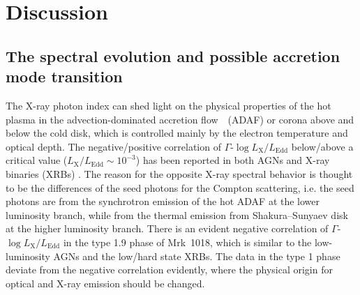 \section{Discussion}\label{sec:discussion}
\subsection{The spectral evolution and possible accretion mode transition }
\label{sec:spectral evolution}
The X-ray photon index can shed light on the physical properties of the hot plasma in the advection-dominated
accretion flow　(ADAF) or corona above and below the cold disk, which is controlled mainly by the electron temperature and optical depth. The negative/positive correlation of $\Gamma$-$\log{L_\mathrm{X}/L_\mathrm{Edd}}$ below/above a critical value ($L_\mathrm{X}/L_\mathrm{Edd} \sim 10^{-3}$) has been reported in both AGNs and X-ray binaries (XRBs) \citep[e.g.][]{2008ApJ...682..212W,2009MNRAS.399..349G,2011A&A...530A.149Y,2015MNRAS.447.1692Y,2020ApJ...889L..18Y}. The reason for the opposite X-ray spectral behavior is thought to be the differences of the seed photons for the Compton scattering, i.e. the seed photons are from the synchrotron emission of the hot ADAF at the lower luminosity branch, while from the thermal emission from Shakura--Sunyaev disk \citep[SSD; e.g. ][]{2013ApJ...764....2Q} at the higher luminosity branch. There is an evident negative correlation of $\Gamma$-$\log{L_\mathrm{X}/L_\mathrm{Edd}}$ in the type 1.9 phase of Mrk~1018, which is similar to the low-luminosity AGNs and the low/hard state XRBs. The data in the type 1 phase deviate from the negative correlation evidently, where the physical origin for optical and X-ray emission should be changed. 

